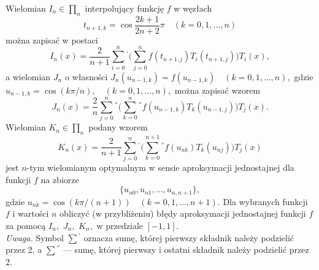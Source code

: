 \documentclass[11pt, wide]{mwart}
\begin{document}
\noindent Wielomian $I_n \in \prod_n$ interpolujący funkcję $f$ w węzłach
\begin{equation*}
t_{n+1,k} = \cos \frac{2k+1}{2n+2} \pi \quad (k = 0,1,\dots ,n)
\end{equation*}
można zapisać w postaci
\begin{equation*}
I_n(x) = \frac{2}{n+1} \sum_{i=0}^n{}^{'} \Big( \sum_{j=0}^n f(t_{n+1,j})T_i(t_{n+1, j}) \Big) T_i(x),
\end{equation*}
a wielomian $J_n$ o własności $J_n(u_{n-1,k}) = f(u_{n-1,k}) \quad (k = 0, 1,\dots, n),$ gdzie $u_{n-1, k} = \cos (k\pi / n), \quad (k = 0, 1,\dots, n),$ można zapisać wzorem
\begin{equation*}
J_n(x) = \frac{2}{n} \sum_{j=0}^n {}^{''} \Big( \sum_{k=0}^n {}^{''} f(u_{n-1, k}) T_k(u_{n-1, j}) \Big) T_j(x).
\end{equation*}
Wielomian $K_n \in \prod_n$ podany wzorem
\begin{equation*}
K_n(x) = \frac{2}{n+1} \sum_{j=0}^n {}^{'} \Big( \sum_{k=0}^{n+1} {}^{''} f(u_{nk})T_k(u_{nj}) \Big) T_j(x)
\end{equation*}
jest $n$-tym wielomianym optymalnym w sensie aproksymacji jednostajnej dla funkcji $f$ na zbiorze
\begin{equation*}
\{ u_{n0}, u_{n1}, \dots, u_{n, n+1} \} ,
\end{equation*} 
gdzie $u_{nk} = \cos (k\pi /(n+1)) \quad (k=0, 1, \dots, n+1).$ Dla wybranych funkcji $f$ i wartości $n$ obliczyć (w przybliżeniu) błędy aproksymacji jednostajnej funkcji $f$ za pomocą $I_n,$ $J_n,$ $K_n,$ w przedziale $[-1,1].$ \\
\textit{Uwaga.} Symbol $ \sum {} ^ {'}$ oznacza sumę, której pierwszy składnik należy podzielić przez 2, a $\sum {}^{''}$ --- sumę, której pierwszy i ostatni składnik należy podzielić przez 2.
\end{document}
